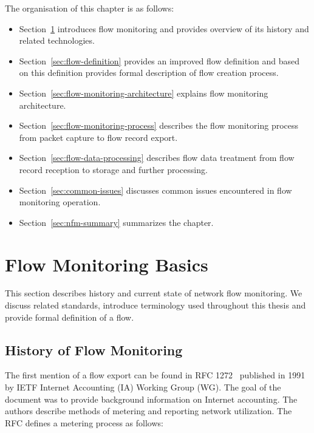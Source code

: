 \begin{chapintro}
The organisation of this chapter is as follows:
\begin{itemize}
  \item Section~\ref{sec:flow-monitoring-basics} introduces flow monitoring and provides overview of its history and related technologies.
  \item Section~\ref{sec:flow-definition} provides an improved flow definition and based on this definition provides formal description of flow creation process.
  \item Section~\ref{sec:flow-monitoring-architecture} explains flow monitoring architecture.
  \item Section~\ref{sec:flow-monitoring-process} describes the flow monitoring process from packet capture to flow record export.
  \item Section~\ref{sec:flow-data-processing} describes flow data treatment from flow record reception to storage and further processing.
  \item Section~\ref{sec:common-issues} discusses common issues encountered in flow monitoring operation.
  \item Section~\ref{sec:nfm-summary} summarizes the chapter.
\end{itemize}

\end{chapintro}

\newpage

\section{Flow Monitoring Basics}\label{sec:flow-monitoring-basics}

This section describes history and current state of network flow monitoring. We discuss related standards, introduce terminology used throughout this thesis and provide formal definition of a flow. 

\subsection{History of Flow Monitoring}\label{subsec:history-of-flow-monitoring}

The first mention of a flow export can be found in RFC 1272~\cite{rfc1272} published in 1991 by IETF Internet Accounting (IA) Working Group (WG). The goal of the document was to provide background information on Internet accounting. The authors describe methods of metering and reporting network utilization. The RFC defines a metering process as follows:

